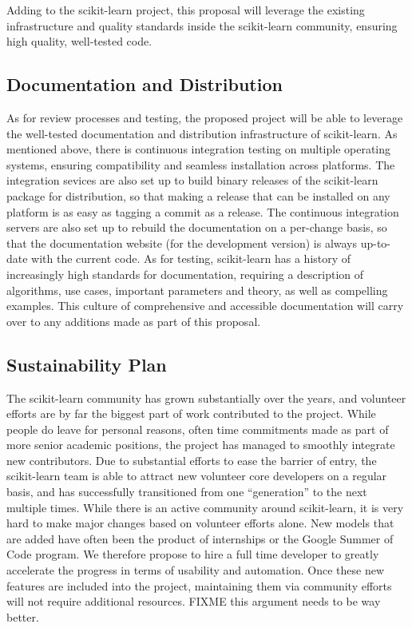 Adding to the scikit-learn project, this proposal will leverage the existing infrastructure
and quality standards inside the scikit-learn community, ensuring high quality, well-tested code.

\subsection{Documentation and Distribution}
As for review processes and testing, the proposed project will be able to leverage the
well-tested documentation and distribution infrastructure of scikit-learn.
As mentioned above, there is continuous integration testing on multiple operating systems,
ensuring compatibility and seamless installation across platforms.
The integration sevices are also set up to build binary releases of the scikit-learn package
for distribution, so that making a release that can be installed on any platform is as
easy as tagging a commit as a release.
The continuous integration servers are also set up to rebuild the documentation on a per-change
basis, so that the documentation website (for the development version) is always up-to-date
with the current code.
As for testing, scikit-learn has a history of increasingly high standards for documentation,
requiring a description of algorithms, use cases, important parameters and theory,
as well as compelling examples. This culture of comprehensive and accessible documentation
will carry over to any additions made as part of this proposal.

\subsection{Sustainability Plan}
The scikit-learn community has grown substantially over the years, and volunteer efforts
are by far the biggest part of work contributed to the project.
While people do leave for personal reasons, often time commitments made as part
of more senior academic positions, the project has managed to smoothly integrate new
contributors. Due to substantial efforts to ease the barrier of entry, the scikit-learn
team is able to attract new volunteer core developers on a regular basis, and has
successfully transitioned from one ``generation'' to the next multiple times.
While there is an active community around scikit-learn, it is very hard to make
major changes based on volunteer efforts alone. New models that are added have often
been the product of internships or the Google Summer of Code program.
We therefore propose to hire a full time developer to greatly accelerate the progress
in terms of usability and automation.
Once these new features are included into the project, maintaining them via community
efforts will not require additional resources. FIXME this argument needs to be way better.

